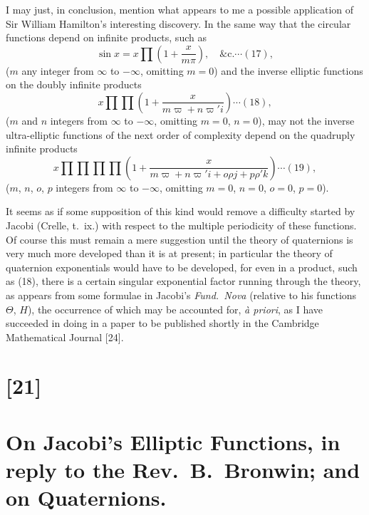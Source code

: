 \documentclass[12pt,a4paper]{article}
\begin{document}
I may just, in conclusion, mention what appears to me a possible application of Sir William Hamilton's interesting discovery. In the same way that the circular functions depend on infinite products, such as
\begin{equation*}
\sin x = x\prod\left(1 + \frac{x}{m\pi}\right),\quad\&\text{c.} \cdots(17),
\end{equation*}
($m$ any integer from $\infty$ to $-\infty$, omitting $m=0$)
and the inverse elliptic functions on the doubly infinite products
\begin{equation*}
x\prod\prod\left(1 + \frac{x}{m\varpi + n\varpi'i}\right) \cdots(18),
\end{equation*}
($m$ and $n$ integers from $\infty$ to $-\infty$, omitting $m=0$, $n=0$),
may not the inverse ultra-elliptic functions of the next order of complexity depend on the quadruply infinite products
\begin{equation*}
x\prod\prod\prod\prod\left(1 + \frac{x}{m\varpi + n\varpi' i + o\rho j + p\rho' k}\right) \cdots(19),
\end{equation*}
($m$, $n$, $o$, $p$ integers from $\infty$ to $-\infty$, omitting $m=0$, $n=0$, $o=0$, $p=0$).

It seems as if some supposition of this kind would remove a difficulty started by Jacobi (Crelle, t.~ix.) with respect to the multiple periodicity of these functions. Of course this must remain a mere suggestion until the theory of quaternions is very much more developed than it is at present; in particular the theory of quaternion exponentials would have to be developed, for even in a product, such as (18), there is a certain singular exponential factor running through the theory, as appears from some formulae in Jacobi's \textit{Fund.\ Nova} (relative to his functions $\Theta$, $H$), the occurrence of which may be accounted for, \textit{\`a priori}, as I have succeeded in doing in a paper to be published shortly in the Cambridge Mathematical Journal [24].

\newpage
\section*{[21]}
\section*{On Jacobi's Elliptic Functions, in reply to the Rev.~B.~Bronwin; and on Quaternions.}
\end{document}
